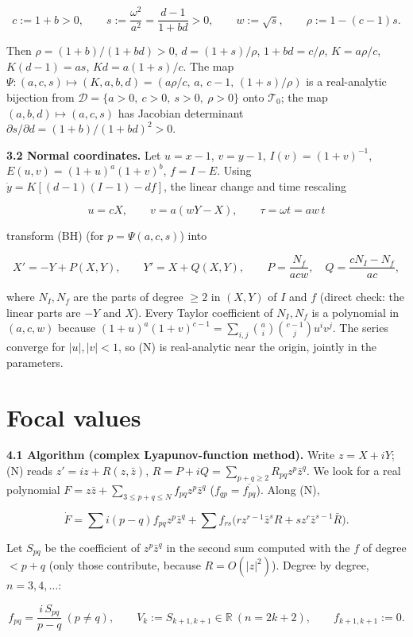 \documentclass[11pt,a4paper]{report}
\begin{document}
\[c:=1+b>0,\qquad s:=\frac{\omega^2}{a^2}=\frac{d-1}{1+bd}>0,\qquad w:=\sqrt s,\qquad \rho:=1-(c-1)s .\]

Then \(\rho=(1+b)/(1+bd)>0\), \(d=(1+s)/\rho\), \(1+bd=c/\rho\), \(K=a\rho/c\), \(K(d-1)=as\),
\(Kd=a(1+s)/c\). The map \(\Psi:(a,c,s)\mapsto (K,a,b,d)=(a\rho/c,\,a,\,c-1,\,(1+s)/\rho)\) is a real-analytic
bijection from \(\mathcal D=\{a>0,\ c>0,\ s>0,\ \rho>0\}\) onto \(\mathcal T_0\); the map
\((a,b,d)\mapsto(a,c,s)\) has Jacobian determinant \(\partial s/\partial d=(1+b)/(1+bd)^2>0\).

\textbf{3.2 Normal coordinates.} Let \(u=x-1\), \(v=y-1\), \(I(v)=(1+v)^{-1}\), \(E(u,v)=(1+u)^a(1+v)^b\),
\(f=I-E\). Using \(\dot y=K[(d-1)(I-1)-d f]\), the linear change and time rescaling

\[u=cX,\qquad v=a(wY-X),\qquad \tau=\omega t=a w\,t\]

transform (BH) (for \(p=\Psi(a,c,s)\)) into

\[X'=-Y+P(X,Y),\qquad Y'=X+Q(X,Y),\qquad
P=\frac{N_f}{acw},\quad Q=\frac{cN_I-N_f}{ac}, \tag{N}\]

where \(N_I,N_f\) are the parts of degree \(\ge2\) in \((X,Y)\) of \(I\) and \(f\) (direct check: the linear
parts are \(-Y\) and \(X\)). Every Taylor coefficient of \(N_I,N_f\) is a polynomial in \((a,c,w)\) because
\((1+u)^a(1+v)^{c-1}=\sum_{i,j}\binom{a}{i}\binom{c-1}{j}u^iv^j\). The series converge for \(|u|,|v|<1\), so
(N) is real-analytic near the origin, jointly in the parameters.

\section{Focal values}

\textbf{4.1 Algorithm (complex Lyapunov-function method).} Write \(z=X+iY\); (N) reads \(z'=iz+R(z,\bar z)\),
\(R=P+iQ=\sum_{p+q\ge2}R_{pq}z^p\bar z^q\). We look for a real polynomial
\(F=z\bar z+\sum_{3\le p+q\le N}f_{pq}z^p\bar z^q\) (\(f_{qp}=\overline{f_{pq}}\)). Along (N),

\[\dot F=\sum i(p-q)f_{pq}z^p\bar z^q+\sum f_{rs}\big(r z^{r-1}\bar z^{s}R+s z^r\bar z^{s-1}\bar R\big).\]

Let \(S_{pq}\) be the coefficient of \(z^p\bar z^q\) in the second sum computed with the \(f\) of degree
\(<p+q\) (only those contribute, because \(R=O(|z|^2)\)). Degree by degree, \(n=3,4,\dots\):

\[f_{pq}=\frac{i\,S_{pq}}{p-q}\ (p\ne q),\qquad V_k:=S_{k+1,k+1}\in\mathbb R\ (n=2k+2),\qquad f_{k+1,k+1}:=0 .\]
\end{document}
